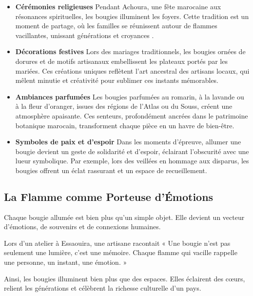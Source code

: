 \documentclass[11pt,fleqn,onecolumn,oneside]{book}
\begin{document}
\begin{itemize}
    \item \textbf{Cérémonies religieuses} Pendant Achoura, une fête marocaine aux résonances spirituelles, les bougies illuminent les foyers. Cette tradition est un moment de partage, où les familles se réunissent autour de flammes vacillantes, unissant générations et croyances \cite{kasmi2018}.
    
    \item \textbf{Décorations festives} Lors des mariages traditionnels, les bougies ornées de dorures et de motifs artisanaux embellissent les plateaux portés par les mariées. Ces créations uniques reflètent l’art ancestral des artisans locaux, qui mêlent minutie et créativité pour sublimer ces instants mémorables.
    
    \item \textbf{Ambiances parfumées} Les bougies parfumées au romarin, à la lavande ou à la fleur d’oranger, issues des régions de l’Atlas ou du Souss, créent une atmosphère apaisante. Ces senteurs, profondément ancrées dans le patrimoine botanique marocain, transforment chaque pièce en un havre de bien-être.
    
    \item \textbf{Symboles de paix et d’espoir} Dans les moments d’épreuve, allumer une bougie devient un geste de solidarité et d’espoir, éclairant l’obscurité avec une lueur symbolique. Par exemple, lors des veillées en hommage aux disparus, les bougies offrent un éclat rassurant et un espace de recueillement.
\end{itemize}

\subsection*{La Flamme comme Porteuse d’Émotions}

\begin{corollary}
Chaque bougie allumée est bien plus qu’un simple objet. Elle devient un vecteur d’émotions, de souvenirs et de connexions humaines.
\end{corollary}

\begin{example}
Lors d’un atelier à Essaouira, une artisane racontait « Une bougie n’est pas seulement une lumière, c’est une mémoire. Chaque flamme qui vacille rappelle une personne, un instant, une émotion. »
\end{example}

\noindent
Ainsi, les bougies illuminent bien plus que des espaces. Elles éclairent des cœurs, relient les générations et célèbrent la richesse culturelle d’un pays.
\end{document}
